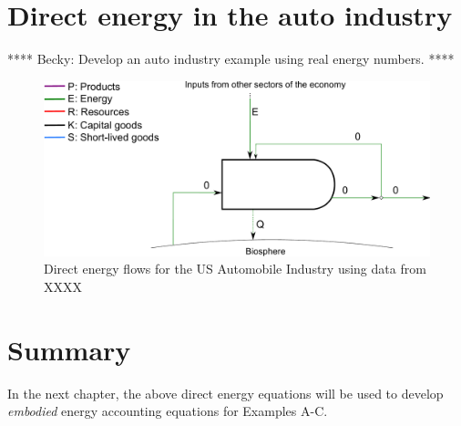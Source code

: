 \section{Direct energy in the auto industry}
\label{sec:energy_auto}

**** Becky: Develop an auto industry example using real energy numbers. ****

\begin{figure}[!ht]
\centering
\includegraphics[width=0.8\linewidth]{Part_2/Chapter_Energy/images/PERKS_basic_unit_energy_auto_ind.pdf}
\caption{Direct energy flows for the US Automobile Industry using data from XXXX}
\label{fig:PERKS_energy_auto}
\end{figure}


\section{Summary}
\label{sec:energy_summary}

In the next chapter, the above direct energy equations will be used to 
develop \emph{embodied} energy accounting equations for Examples A-C.












